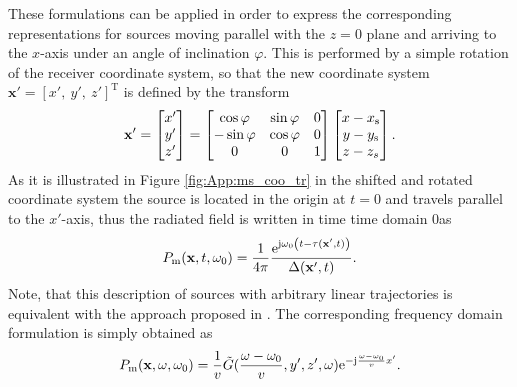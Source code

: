 These formulations can be applied in order to express the corresponding representations for sources moving parallel with the $z=0$ plane and arriving to the $x$-axis under an angle of inclination $\varphi$.
This is performed by a simple rotation of the receiver coordinate system, so that the new coordinate system $\mathbf{x'}= [x',\ y',\ z']^{\mathrm{T}}$ is defined by the transform
%
\begin{equation}
\mathbf{x}'=
\begin{bmatrix} x' \\ y' \\ z' \end{bmatrix}
=
\begin{bmatrix}
\cos\varphi  &  \sin\varphi & 0\\
-\sin\varphi & \cos\varphi &0\\
0       &   0 &   1
\end{bmatrix}
\begin{bmatrix} x-x_\mathrm{s} \\ y-y_\mathrm{s} \\ z -z_s \end{bmatrix}.
\label{eq:transform_matrix}
\end{equation} 
%
As it is illustrated in Figure \ref{fig:App:ms_coo_tr} in the shifted and rotated coordinate system the source is located in the origin at $t = 0$ and travels parallel to the $x'$-axis, thus the radiated field is written in time time domain 0as
\begin{equation}
P_{\mathrm{m}}(\mathbf{x},t,\omega_0) = \frac{1}{4\pi} \frac{\mathrm{e}^{\mathrm{j} \omega_0 \left(t - \tau(\mathbf{x}',t) \right)}}{\Delta(\mathbf{x}',t)}.
\label{eq:inclined_field}
\end{equation}
Note, that this description of sources with arbitrary linear trajectories is equivalent with the approach proposed in \cite{Ahrens2008moving}.
The corresponding frequency domain formulation is simply obtained as
\begin{equation}
P_{\mathrm{m}}(\mathbf{x},\omega,\omega_0) =
\frac{1}{v}
\tilde{G}(\frac{\omega-\omega_0}{v}, y', z', \omega)
\mathrm{e}^{-\mathrm{j} \frac{\omega-\omega_0}{v} x'}.
\label{eq:inclined_field_omega}
\end{equation}

